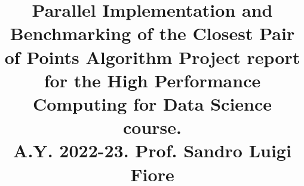 
\title{
    Parallel Implementation and Benchmarking of the Closest Pair of Points Algorithm
    \break
    \break
    \footnotesize{
        Project report for the High Performance Computing for Data Science course. \\
        A.Y. 2022-23. Prof. Sandro Luigi Fiore
    }
}

\author{
    \and
}

\maketitle
